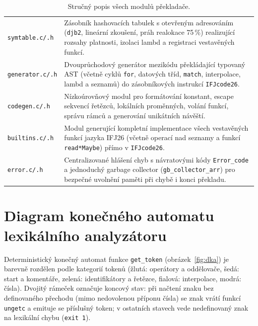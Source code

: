 \documentclass[11pt, a4paper]{article}
\begin{document}
\begin{table}[H]
\begin{tabularx}{\textwidth}{l X}
    \texttt{symtable.c/.h} & Zásobník hashovacích tabulek s otevřeným adresováním (\texttt{djb2}, lineární zkoušení, práh realokace 75\,\%) realizující rozsahy platnosti, izolaci lambd a registraci vestavěných funkcí. \\
    \texttt{generator.c/.h} & Dvouprůchodový generátor mezikódu překládající typovaný AST (včetně cyklů \texttt{for}, datových tříd, \texttt{match}, interpolace, lambd a seznamů) do zásobníkových instrukcí \texttt{IFJcode26}. \\
    \texttt{codegen.c/.h} & Nízkoúrovňový modul pro formátování konstant, escape sekvencí řetězců, lokálních proměnných, volání funkcí, správu rámců a generování unikátních návěští. \\
    \texttt{builtins.c/.h} & Modul generující kompletní implementace všech vestavěných funkcí jazyka IFJ26 (včetně operací nad seznamy a funkcí \texttt{read*Maybe}) přímo v \texttt{IFJcode26}. \\
    \texttt{error.c/.h} & Centralizované hlášení chyb s návratovými kódy \texttt{Error\_code} a jednoduchý garbage collector (\texttt{gb\_collector\_arr}) pro bezpečné uvolnění paměti při chybě i konci překladu. \\
    \bottomrule
  \end{tabularx}
  \caption{Stručný popis všech modulů překladače.}
  \label{tab:moduly}
\end{table}
\newpage
\section{Diagram konečného automatu lexikálního analyzátoru}

Deterministický konečný automat funkce \texttt{get\_token} (obrázek~\ref{fig:dka}) je barevně rozdělen podle kategorií tokenů (žlutá: operátory a oddělovače, šedá: start a komentáře, zelená: identifikátory a řetězce, fialová: interpolace, modrá: čísla). Dvojitý rámeček označuje koncový stav: při načtení znaku bez definovaného přechodu (mimo nedovolenou příponu čísla) se znak vrátí funkcí \texttt{ungetc} a emituje se příslušný token; v ostatních stavech vede nedefinovaný znak na lexikální chybu (\texttt{exit~1}).
\end{document}
